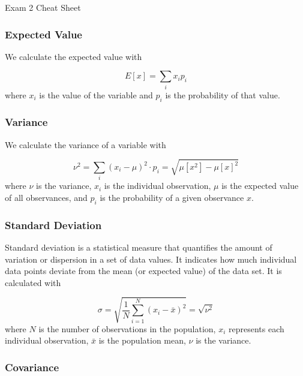 \begin{cheatsheet}{Exam 2 Cheat Sheet}
{        \subsubsection*{Expected Value}
    
        We calculate the expected value with
    
        \begin{equation*}
            E[x] = \sum_{i} x_{i}p_{i}
        \end{equation*}
        where $x_{i}$ is the value of the variable and $p_{i}$ is the probability of that value.
    
        \subsubsection*{Variance}
    
        We calculate the variance of a variable with
    
        \begin{equation*}
            \nu^{2} = \sum_{i}(x_{i} - \mu)^{2} \cdot p_{i} = \sqrt{\mu[x^{2}] - \mu[x]^2}
        \end{equation*}
        where $\nu$ is the variance, $x_{i}$ is the individual observation, $\mu$ is the expected value of all observances, and $p_{i}$ is the probability of a given observance $x$.
    
        \subsubsection*{Standard Deviation}
    
        Standard deviation is a statistical measure that quantifies the amount of variation or dispersion in a set of data values. It indicates how much individual data points deviate from the mean 
        (or expected value) of the data set. It is calculated with
    
        \begin{equation*}
            \sigma = \sqrt{\frac{1}{N}\sum_{i=1}^{N}(x_i - \bar{x})^2} = \sqrt{\nu^{2}}
        \end{equation*}
        where $N$ is the number of observations in the population, $x_i$ represents each individual observation, $\bar{x}$ is the population mean, $\nu$ is the variance.
    
        \subsubsection*{Covariance}
    
}
\end{cheatsheet}
